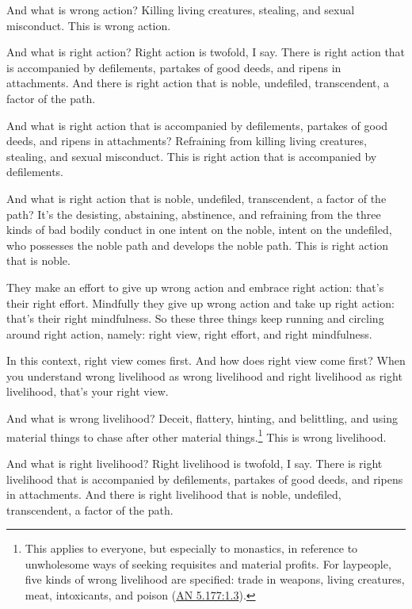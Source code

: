 \documentclass[12pt,openany]{book}%
\begin{document}
And what is wrong action? Killing living creatures, stealing, and sexual misconduct. This is wrong action. 

And what is right action? Right action is twofold, I say. There is right action that is accompanied by defilements, partakes of good deeds, and ripens in attachments. And there is right action that is noble, undefiled, transcendent, a factor of the path. 

And what is right action that is accompanied by defilements, partakes of good deeds, and ripens in attachments? Refraining from killing living creatures, stealing, and sexual misconduct. This is right action that is accompanied by defilements. 

And what is right action that is noble, undefiled, transcendent, a factor of the path? It’s the desisting, abstaining, abstinence, and refraining from the three kinds of bad bodily conduct in one intent on the noble, intent on the undefiled, who possesses the noble path and develops the noble path. This is right action that is noble. 

They make an effort to give up wrong action and embrace right action: that’s their right effort. Mindfully they give up wrong action and take up right action: that’s their right mindfulness. So these three things keep running and circling around right action, namely: right view, right effort, and right mindfulness. 

In this context, right view comes first. And how does right view come first? When you understand wrong livelihood as wrong livelihood and right livelihood as right livelihood, that’s your right view. 

And what is wrong livelihood? Deceit, flattery, hinting, and belittling, and using material things to chase after other material things.\footnote{This applies to everyone, but especially to monastics, in reference to unwholesome ways of seeking requisites and material profits. For laypeople, five kinds of wrong livelihood are specified: trade in weapons, living creatures, meat, intoxicants, and poison (\href{https://suttacentral.net/an5.177/en/sujato\#1.3}{AN 5.177:1.3}). } This is wrong livelihood. 

And what is right livelihood? Right livelihood is twofold, I say. There is right livelihood that is accompanied by defilements, partakes of good deeds, and ripens in attachments. And there is right livelihood that is noble, undefiled, transcendent, a factor of the path. 
\end{document}
